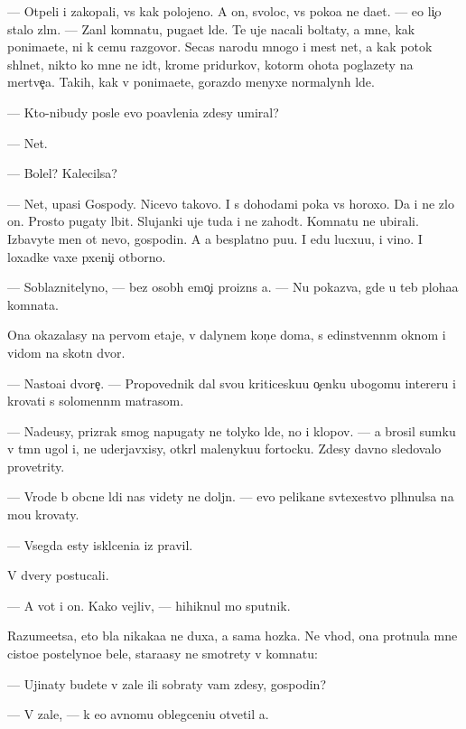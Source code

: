 \documentclass[10pt]{book}
\begin{document}
— Otpeli i zakopali, vs{\e} kak polojeno. A on, svoloc, vs{\e} poko{\y}a ne da{\y}et. — {\y}e{\y}o li{\c}o stalo zl{\yi}m. — Zan{\ia}l komnatu, puga{\y}et l{\iu}de{\y}. Te uje nacali boltaty, a mne, kak ponima{\y}ete, ni k cemu razgovor{\yi}. Se{\y}cas narodu mnogo i mest net, a kak potok shl{\yi}net, nikto ko mne ne id{\e}t, krome pridurkov, kotor{\yi}m ohota poglazety na mertve{\c}a. Takih, kak v{\yi} ponima{\y}ete, gorazdo menyxe normalyn{\yi}h l{\iu}de{\y}.

— Kto-nibudy posle {\y}evo po{\y}avleni{\y}a zdesy umiral?

— Net.

— Bolel? Kalecilsa?

— Net, upasi Gospody. Nicevo takovo. I s dohodami poka vs{\e} horoxo. Da i ne zlo{\y} on. Prosto pugaty l{\iu}bit. Slujanki uje tuda i ne zahod{\ia}t. Komnatu ne ubirali. Izbavyte men{\ia} ot nevo, gospodin. A {\y}a besplatno pu{\x}u. I {\y}edu lucxu{\y}u, i vino. I loxadke vaxe{\y} pxeni{\c}i otborno{\y}.

— Soblaznitelyno, — bez osob{\yi}h emo{\c}i{\y} proizn{\e}s {\y}a. — Nu pokaz{\yi}va{\y}, gde u teb{\ia} ploha{\y}a komnata.

Ona okazalasy na pervom etaje, v dalynem kon{\c}e doma, s {\y}edinstvenn{\yi}m oknom i vidom na skotn{\yi}{\y} dvor.

— Nasto{\y}a{\x}i{\y} dvore{\c}. — Propovednik dal svo{\y}u kriticesku{\y}u o{\c}enku ubogomu inter{\y}eru i krovati s solomenn{\yi}m matrasom.

— Nade{\y}usy, prizrak smog napugaty ne tolyko l{\iu}de{\y}, no i klopov. — {\Y}a brosil sumku v t{\e}mn{\yi}{\y} ugol i, ne uderjavxisy, otkr{\yi}l malenyku{\y}u fortocku. Zdesy davno sledovalo provetrity.

— Vrode b{\yi} ob{\yi}cn{\yi}{\y}e l{\iu}di nas videty ne doljn{\yi}. — {\Y}evo pelikan{\y}e sv{\ia}te{\y}xestvo pl{\iu}hnulsa na mo{\y}u krovaty.

— Vsegda {\y}esty iskl{\iu}ceni{\y}a iz pravil.

V dvery postucali.

— A vot i on. Kako{\y} vejliv{\yi}{\y}, — hihiknul mo{\y} sputnik.

Razume{\y}etsa, eto b{\yi}la nikaka{\y}a ne duxa, a sama hoz{\ia}{\y}ka. Ne vhod{\ia}, ona prot{\ia}nula mne cisto{\y}e postelyno{\y}e bel{\y}e, stara{\y}asy ne smotrety v komnatu:

— Ujinaty budete v zale ili sobraty vam zdesy, gospodin?

— V zale, — k {\y}e{\y}o {\y}avnomu oblegceni{\y}u otvetil {\y}a.
\end{document}
